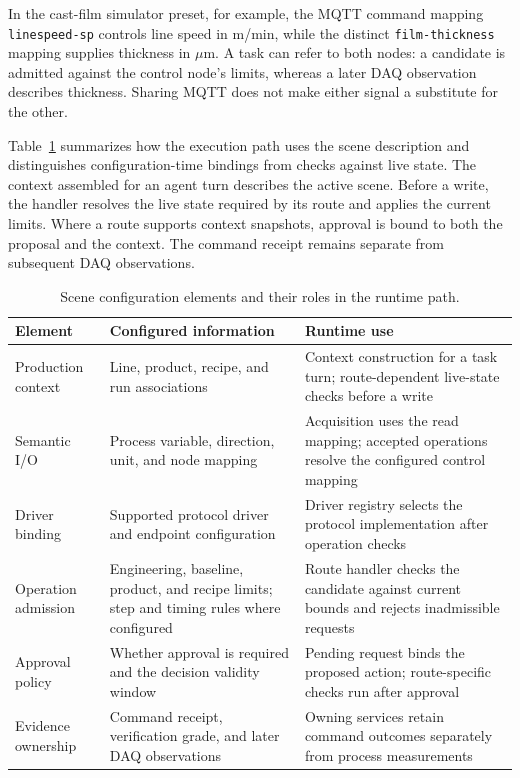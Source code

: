 \documentclass[journal]{IEEEtran}
\begin{document}
In the cast-film simulator preset, for example, the MQTT command mapping
\texttt{linespeed-sp} controls line speed in m/min, while the distinct
\texttt{film-thickness} mapping supplies thickness in $\mu$m. A task can
refer to both nodes: a candidate is admitted against the control node's
limits, whereas a later DAQ observation describes thickness. Sharing MQTT does
not make either signal a substitute for the other.

Table~\ref{tab:scene-config} summarizes how the execution path uses the scene
description and distinguishes configuration-time bindings from checks against
live state. The context assembled for an agent turn describes the active scene. Before a
write, the handler resolves the live state required by its route and applies
the current limits. Where a route supports context snapshots, approval is
bound to both the proposal and the context. The command receipt remains
separate from subsequent DAQ observations.

\begin{table}[!t]
\centering
\caption{Scene configuration elements and their roles in the runtime path.}
\label{tab:scene-config}
\footnotesize
\setlength{\tabcolsep}{5pt}
\begin{tabularx}{\textwidth}{@{}>{\raggedright\arraybackslash}p{}>{\raggedright\arraybackslash}p{}X@{}}
\toprule
Element & Configured information & Runtime use\\
\midrule
Production context & Line, product, recipe, and run associations & Context construction for a task turn; route-dependent live-state checks before a write\\
Semantic I/O & Process variable, direction, unit, and node mapping & Acquisition uses the read mapping; accepted operations resolve the configured control mapping\\
Driver binding & Supported protocol driver and endpoint configuration & Driver registry selects the protocol implementation after operation checks\\
Operation admission & Engineering, baseline, product, and recipe limits; step and timing rules where configured & Route handler checks the candidate against current bounds and rejects inadmissible requests\\
Approval policy & Whether approval is required and the decision validity window & Pending request binds the proposed action; route-specific checks run after approval\\
Evidence ownership & Command receipt, verification grade, and later DAQ observations & Owning services retain command outcomes separately from process measurements\\
\bottomrule
\end{tabularx}
\end{table}
\end{document}

